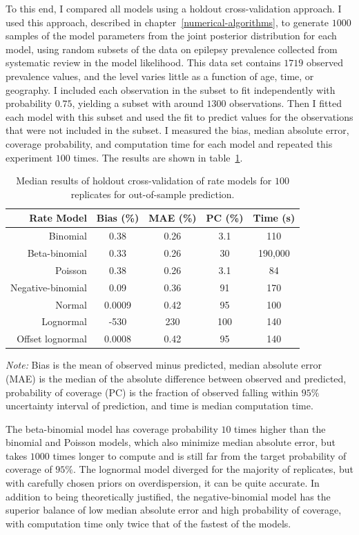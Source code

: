 To this end, I compared all models using a holdout cross-validation
approach.  I used this approach, described in
chapter~\ref{numerical-algorithms}, to generate $1000$ samples of the
model parameters from the joint posterior distribution for each model,
using random subsets of the data on epilepsy prevalence collected from
systematic review\cite{TK_Epilepsy_EG_report} in the model likelihood.  This data set
contains $1719$ observed prevalence values, and the level varies
little as a function of age, time, or geography.  I included each
observation in the subset to fit independently with probability $0.75$,
yielding a subset with around $1300$ observations. Then I fitted each
model with this subset and used the fit to predict values for the
observations that were not included in the subset.  I measured the
bias, median absolute error, coverage probability, and computation
time for each model and repeated this experiment $100$ times.  The
results are shown in table~\ref{rate-comparison}.

\begin{table}
\caption{Median results of holdout cross-validation of rate models
  for $100$ replicates for out-of-sample prediction.}
\label{rate-comparison}
\begin{center}
\begin{tabular}{|r|c|c|c|c|}
\hline
Rate Model       &Bias (\%)&MAE (\%)&PC (\%)&Time (s)\\
\hline
Binomial         &0.38     &0.26    &3.1    &110\\
Beta-binomial    &0.33     &0.26    &30     &190,000\\
Poisson          &0.38     &0.26    &3.1    &84\\
Negative-binomial&0.09     &0.36    &91     &170\\
Normal           &0.0009   &0.42    &95     &100\\
Lognormal       &-530     &230     &100    &140\\
Offset lognormal&0.0008   &0.42    &95     &140\\
\hline
\end{tabular}
\end{center}
\emph{Note:} Bias is the mean
  of observed minus predicted, median absolute error (MAE) is the median of
  the absolute difference between observed and predicted, probability
  of coverage (PC) is the fraction of observed falling within $95\%$ uncertainty
  interval of prediction, and time is median computation time.
\end{table}


  The beta-binomial
  model has coverage probability $10$ times higher than the binomial and Poisson models,
  which also minimize median absolute error, but takes $1000$ times
  longer to compute and is still far from the target probability of coverage of $95\%$.
  The lognormal model diverged for the majority of replicates, but
  with carefully chosen priors on overdispersion, it can be quite
  accurate.  In addition to being theoretically justified, the
  negative-binomial model has the superior balance of low median absolute error and high
  probability of coverage, with computation time only twice that of the fastest of the
  models.
